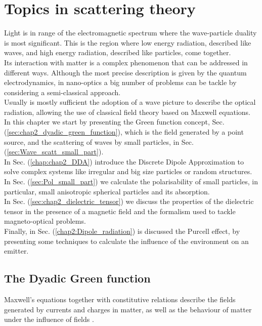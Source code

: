 \chapter{Topics in scattering theory \label{chap:2}}

Light is in range of the electromagnetic spectrum where the wave-particle duality is most significant. This is the region where low energy radiation, described like waves, and high energy radiation, described like particles, come together. \\
Its interaction with matter is a complex phenomenon that can be addressed in different ways. Although the most precise description is given by the quantum electrodynamics, in nano-optics a big number of problems can be tackle by considering a semi-classical approach.\\
Usually is mostly sufficient the adoption of a wave picture to describe the optical radiation, allowing the use of classical field theory based on Maxwell equations.\\

In this chapter we start by presenting the Green function concept, Sec. (\ref{sec:chap2_dyadic_green_function}), which is the field generated by a point source, and the scattering of waves by small particles, in Sec. (\ref{sec:Wave_scatt_small_part}).\\
 In Sec. (\ref{chap:chap2_DDA}) introduce the Discrete Dipole Approximation to solve complex systems like irregular and big size particles or random structures.\\
In Sec. (\ref{sec:Pol_small_part}) we calculate the polarisability of small particles, in particular, small anisotropic spherical particles and its absorption.\\
In Sec. (\ref{sec:chap2_dielectric_tensor}) we discuss the properties of the dielectric tensor in the presence of a magnetic field and the formalism used to tackle magneto-optical problems.\\
Finally, in Sec. (\ref{chap2:Dipole_radiation}) is discussed the Purcell effect, by presenting some techniques to calculate the influence of the environment on an emitter.

\section{The Dyadic Green function\label{sec:chap2_dyadic_green_function}}

Maxwell's equations together with constitutive relations describe the fields generated by currents and charges in matter, as well as the behaviour of matter under the influence of fields \cite{Jackson_CE}.


